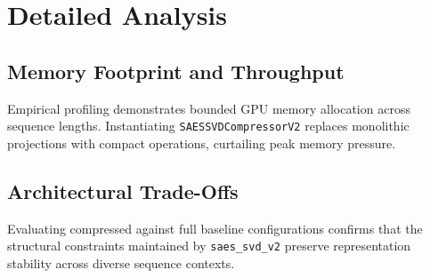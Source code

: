 \section{Detailed Analysis}

\subsection{Memory Footprint and Throughput}
Empirical profiling demonstrates bounded GPU memory allocation across sequence lengths. Instantiating \texttt{SAESSVDCompressorV2} replaces monolithic projections with compact operations, curtailing peak memory pressure.

\subsection{Architectural Trade-Offs}
Evaluating compressed against full baseline configurations confirms that the structural constraints maintained by \texttt{saes_svd_v2} preserve representation stability across diverse sequence contexts.
